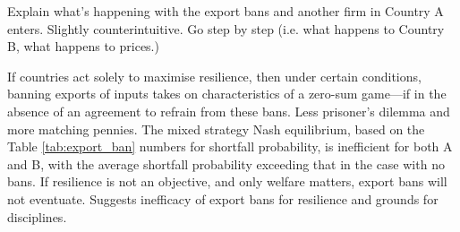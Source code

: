 \documentclass{article}
\begin{document}
Explain what's happening with the export bans and another firm in Country A enters. Slightly counterintuitive. Go step by step (i.e. what happens to Country B, what happens to prices.)

If countries act solely to maximise resilience, then under certain conditions, banning exports of inputs takes on characteristics of a zero-sum game---if in the absence of an agreement to refrain from these bans. Less prisoner's dilemma and more matching pennies. The mixed strategy Nash equilibrium, based on the Table \ref{tab:export_ban} numbers for shortfall probability, is inefficient for both A and B, with the average shortfall probability exceeding that in the case with no bans. If resilience is not an objective, and only welfare matters, export bans will not eventuate. Suggests inefficacy of export bans for resilience and grounds for disciplines.
\end{document}
